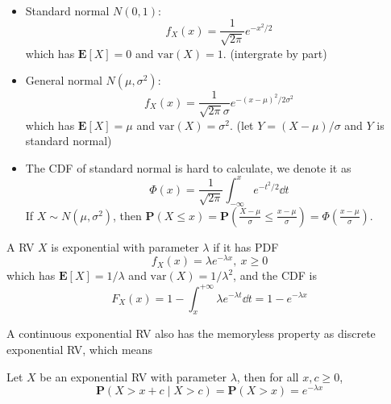 \begin{definition} ~
    \begin{itemize}
        \item Standard normal $N(0, 1)$:
        \begin{equation}
            f_{X}(x) = \frac{1}{\sqrt{2\pi}} e^{-x^2/2}
        \end{equation}
        which has $\mathbf{E}[X] = 0$ and $\text{var}(X) = 1$. (intergrate by part)
        \item General normal $N(\mu, \sigma^2)$:
        \begin{equation}
            f_{X}(x) = \frac{1}{\sqrt{2\pi} \sigma} e^{-(x - \mu)^2/2\sigma^2}
        \end{equation}
        which has $\mathbf{E}[X] = \mu$ and $\text{var}(X) = \sigma^2$. (let $Y = (X - \mu) / \sigma$ and $Y$ is standard normal)
        \item The CDF of standard normal is hard to calculate, we denote it as 
        \begin{equation}
            \Phi(x) = \frac{1}{\sqrt{2\pi}} \int_{-\infty}^{x} e^{-t^2/2} \dd{t}    
        \end{equation}
        If $X \sim N(\mu, \sigma^2)$, then $\mathbf{P}(X \leq x) = \mathbf{P}(\frac{X - \mu}{\sigma} \leq \frac{x - \mu}{\sigma}) = \Phi(\frac{x - \mu}{\sigma})$.
    \end{itemize}
\end{definition}

\begin{definition}[Exponential RV]
    A RV $X$ is exponential with parameter $\lambda$ if it has PDF
    \begin{equation}
        f_{X}(x) = \lambda e^{-\lambda x},~ x \geq 0
    \end{equation}
    which has $\mathbf{E}[X] = 1 / \lambda$ and $\text{var}(X) = 1 / \lambda^2$, and the CDF is
    \begin{equation}
        F_{X}(x) = 1 - \int_{x}^{+\infty} \lambda e^{-\lambda t} \dd{t} = 1 - e^{-\lambda x}
    \end{equation}
\end{definition}

A continuous exponential RV also has the memoryless property as discrete exponential RV, which means
\begin{property}
    Let $X$ be an exponential RV with parameter $\lambda$, then for all $x, c \geq 0$,
    \begin{equation}
        \mathbf{P}(X > x + c \mid X > c) = \mathbf{P}(X > x) = e^{-\lambda x}
    \end{equation}
\end{property}

